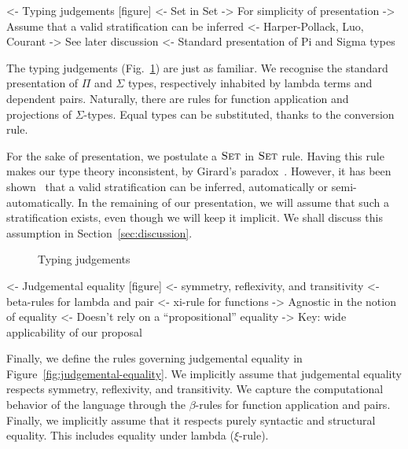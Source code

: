 \begin{wstructure}
<- Typing judgements [figure]
    <- Set in Set
        -> For simplicity of presentation
        -> Assume that a valid stratification can be inferred
            <- Harper-Pollack, Luo, Courant
        -> See later discussion
    <- Standard presentation of Pi and Sigma types
\end{wstructure}

The typing judgements (Fig.~\ref{fig:typing-judgements}) are just as
familiar. We recognise the standard presentation of $\Pi$ and $\Sigma$
types, respectively inhabited by lambda terms and dependent
pairs. Naturally, there are rules for function application and
projections of $\Sigma$-types. Equal types can be substituted, thanks
to the conversion rule.

For the sake of presentation, we postulate a $\Set$ in $\Set$
rule. Having this rule makes our type theory inconsistent, by Girard's
paradox~\cite{girard:set-in-set}. However, it has been
shown~\cite{harper:implicit-universe, luo:utt,
  courant:explicit-universe} that a valid stratification can be
inferred, automatically or semi-automatically. In the remaining of our
presentation, we will assume that such a stratification exists, even
though we will keep it implicit. We shall discuss this assumption in
Section~\ref{sec:discussion}.

\begin{figure}



\caption{Typing judgements}
\label{fig:typing-judgements}

\end{figure}


\begin{wstructure}
<- Judgemental equality [figure]
    <- symmetry, reflexivity, and transitivity
    <- beta-rules for lambda and pair
    <- xi-rule for functions
    -> Agnostic in the notion of equality
        <- Doesn't rely on a ``propositional'' equality
        -> Key: wide applicability of our proposal
\end{wstructure}

Finally, we define the rules governing judgemental equality in
Figure~\ref{fig:judgemental-equality}. We implicitly assume that
judgemental equality respects symmetry, reflexivity, and
transitivity. We capture the computational behavior of the language
through the $\beta$-rules for function application and pairs. Finally,
we implicitly assume that it respects purely syntactic and structural
equality. This includes equality under lambda ($\xi$-rule).

